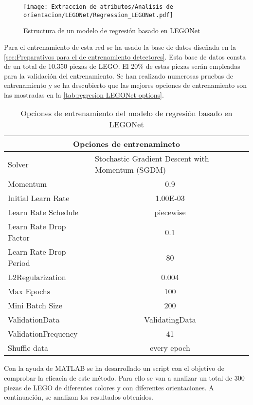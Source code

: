 \begin{figure}[ht]
	\centering
	\texttt{[image: Extraccion de atributos/Analisis de orientacion/LEGONet/Regression\_LEGONet.pdf]}
	\caption{Estructura de un modelo de regresión basado en LEGONet}
	\label{fig:regresion LEGONet estructura}
	\vspace{-5pt}
\end{figure}

Para el entrenamiento de esta red se ha usado la base de datos diseñada en la \autoref{sec:Preparativos para el de entrenamiento detectores}. Esta base de datos consta de un total de 10.350 piezas de LEGO. El 20\% de estas piezas serán empleadas para la validación del entrenamiento. Se han realizado numerosas pruebas de entrenamiento y se ha descubierto que las mejores opciones de entrenamiento son las mostradas en la \autoref{tab:regresion LEGONet options}.

\begin{table}[htbp]
  \centering
    \begin{tabular}{|l|c|}
    \hline
    \multicolumn{2}{|c|}{Opciones de entrenamineto} \\
    \hline
    Solver & \multicolumn{1}{l|}{Stochastic Gradient Descent with Momentum (SGDM)} \\
    \hline
    Momentum & 0.9 \\
    \hline
    Initial Learn Rate & 1.00E-03 \\
    \hline
    Learn Rate Schedule & piecewise \\
    \hline
    Learn Rate Drop Factor & 0.1 \\
    \hline
    Learn Rate Drop Period & 80 \\
    \hline
    L2Regularization & 0.004 \\
    \hline
    Max Epochs & 100 \\
    \hline
    Mini Batch Size & 200 \\
    \hline
    ValidationData & ValidatingData \\
    \hline
    ValidationFrequency & 41 \\
    \hline
    Shuffle data & every epoch \\
    \hline
    \end{tabular}%
  \caption{Opciones de entrenamiento del modelo de regresión basado en LEGONet}
  \label{tab:regresion LEGONet options}%
\end{table}%

Con la ayuda de MATLAB se ha desarrollado un script con el objetivo de comprobar la eficacia de este método. Para ello se van a analizar un total de 300 piezas de LEGO de diferentes colores y con diferentes orientaciones. A continuación, se analizan los resultados obtenidos.

